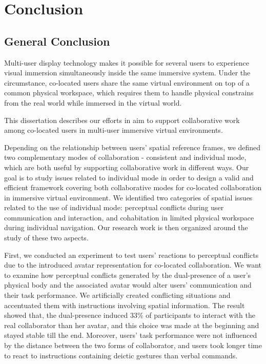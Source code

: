 \chapter*{Conclusion}

\mtcaddchapter[Conclusion]

\section*{General Conclusion}

Multi-user display technology makes it possible for several users to experience visual immersion simultaneously inside the same immersive system. Under the circumstance, co-located users share the same virtual environment on top of a common physical workspace, which requires them to handle physical constrains from the real world while immersed in the virtual world.

This dissertation describes our efforts in aim to support collaborative work among co-located users in multi-user immersive virtual environments.

Depending on the relationship between users' spatial reference frames, we defined two complementary modes of collaboration - consistent and individual mode, which are both useful by supporting collaborative work in different ways. Our goal is to study issues related to individual mode in order to design a valid and efficient framework covering both collaborative modes for co-located collaboration in immersive virtual environment. We identified two categories of spatial issues related to the use of individual mode: perceptual conflicts during user communication and interaction, and cohabitation in limited physical workspace during individual navigation. Our research work is then organized around the study of these two aspects.

First, we conducted an experiment to test users' reactions to perceptual conflicts due to the introduced avatar representation for co-located collaboration. We want to examine how perceptual conflicts generated by the dual-presence of a user's physical body and the associated avatar would alter users' communication and their task performance. We artificially created conflicting situations and accentuated them with instructions involving spatial information. The result showed that, the dual-presence induced 33\% of participants to interact with the real collaborator than her avatar, and this choice was made at the beginning and stayed stable till the end. Moreover, users' task performance were not influenced by the distance between the two forms of collaborator, and users took longer time to react to instructions containing deictic gestures than verbal commands.

